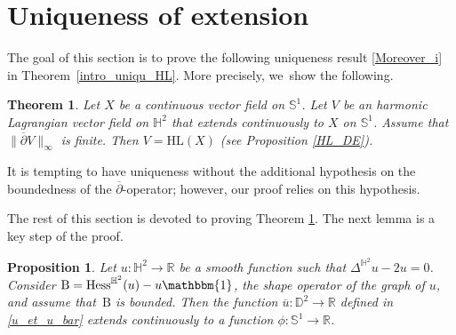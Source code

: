 \documentclass[10pt]{amsart}
\theoremstyle{plain}
\newtheorem{theorem}[cor]{Theorem}
\newtheorem{prop}[cor]{Proposition}
\theoremstyle{definition}
\newcommand{\hess}{\mathrm{Hess}^{\mathbb{H}^2}}
\newcommand{\B}{\mathrm{B}}
\begin{document}
\section{Uniqueness of extension}\label{sec_uniquness}
The goal of this section is to prove the following uniqueness result \eqref{Moreover_i} in Theorem~\ref{intro_uniqu_HL}. More precisely, we~show the following.

\begin{theorem}\label{uniqTH1HL}
Let $X$ be a continuous vector field on $\mathbb{S}^1$. Let $V$ be an harmonic Lagrangian vector field on $\mathbb{H}^2$ that extends continuously to $X$ on $\mathbb{S}^1$. Assume that $\lVert \overline{\partial}V\rVert_{\infty}$ is finite. Then $V=\mathrm{HL}(X)$ (see Proposition \ref{HL_DE}).
\end{theorem}
It is tempting to have uniqueness without the additional hypothesis on the boundedness of the $\overline{\partial}$-operator; however, our proof relies on this hypothesis.

The rest of this section is devoted to proving Theorem \ref{uniqTH1HL}. The next lemma is a key step of the proof.

\begin{prop}\label{zygumund_imply_extension}
Let \(u: \mathbb{H}^2 \to \mathbb{R} \) be a smooth function such that \(\Delta^{\mathbb{H}^2} u - 2u = 0 \). Consider \(\B = \hess(u) - u \mathbbm{1} \), the shape operator of the graph of \(u \), and assume that~\(\B \) is bounded. Then the function \(\overline{u}: \mathbb{D}^2 \to \mathbb{R} \) defined in \eqref{u_et_u_bar} extends continuously to a function \(\phi: \mathbb{S}^1 \to \mathbb{R} \).
\end{prop}
\end{document}
